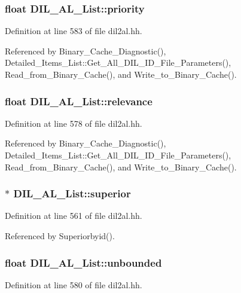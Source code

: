 \subsubsection{\setlength{\rightskip}{0pt plus 5cm}float DIL\_\-AL\_\-List::priority}\label{classDIL__AL__List_m5}




Definition at line 583 of file dil2al.hh.

Referenced by Binary\_\-Cache\_\-Diagnostic(), Detailed\_\-Items\_\-List::Get\_\-All\_\-DIL\_\-ID\_\-File\_\-Parameters(), Read\_\-from\_\-Binary\_\-Cache(), and Write\_\-to\_\-Binary\_\-Cache().
\subsubsection{\setlength{\rightskip}{0pt plus 5cm}float DIL\_\-AL\_\-List::relevance}\label{classDIL__AL__List_m1}




Definition at line 578 of file dil2al.hh.

Referenced by Binary\_\-Cache\_\-Diagnostic(), Detailed\_\-Items\_\-List::Get\_\-All\_\-DIL\_\-ID\_\-File\_\-Parameters(), Read\_\-from\_\-Binary\_\-Cache(), and Write\_\-to\_\-Binary\_\-Cache().
\subsubsection{$\ast$ DIL\_\-AL\_\-List::superior\hspace{0.3cm}{\tt  [protected]}}\label{classDIL__AL__List_n1}




Definition at line 561 of file dil2al.hh.

Referenced by Superiorbyid().
\subsubsection{\setlength{\rightskip}{0pt plus 5cm}float DIL\_\-AL\_\-List::unbounded}\label{classDIL__AL__List_m2}




Definition at line 580 of file dil2al.hh.

